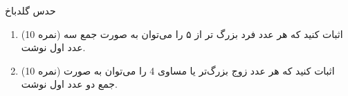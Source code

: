 حدس گلدباخ
\begin{enumerate}
	\item (10 نمره) 
	اثبات کنید که هر عدد فرد بزرگ تر از ۵ را می‌توان به صورت جمع سه عدد اول نوشت.
	
	\item (10 نمره)
	اثبات کنید که هر عدد زوج بزرگ‌تر یا مساوی 4 را می‌توان به صورت جمع دو عدد اول نوشت.
	
\end{enumerate}